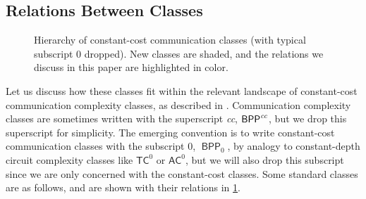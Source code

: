\documentclass[conference]{IEEEtran}
\newcommand{\cplxclass}[1]{\mathsf{#1}}
\DeclareMathOperator{\BPP}{\cplxclass{BPP}}
\begin{document}
\subsection{Relations Between Classes}

\begin{figure}[ht]
    \begin{center}
        
    \end{center}
	\vspace{-5mm}
    \caption{Hierarchy of constant-cost communication classes (with typical subscript $0$ dropped). New classes are shaded, and the relations we discuss in this paper are highlighted in color.}
    \label{fig:hierarchy}
\end{figure}

Let us discuss how these classes fit within the relevant landscape of
constant-cost communication complexity classes, as described in \cite{HH24}.
Communication complexity classes are sometimes written with the superscript
\emph{cc}, \eg $\BPP^\emph{cc}$, but we drop this superscript for simplicity.
The emerging convention is to write constant-cost communication classes with the
subscript $0$, \eg $\BPP_0$, by analogy to constant-depth circuit complexity
classes like $\mathsf{TC}^0$ or $\mathsf{AC}^0$, but we will also drop this subscript
since we are only concerned with the constant-cost classes. Some standard classes
are as follows, and are shown with their relations in \cref{fig:hierarchy}.
\end{document}
